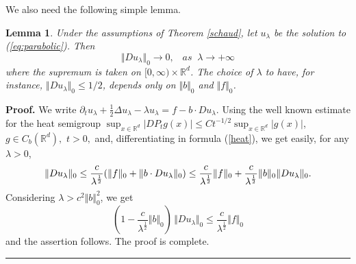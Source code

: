 \documentclass[a4paper,11pt]{article}
\newtheorem{lemma}[theorem]{Lemma}
\newenvironment{proof}[1][Proof]{\textbf{#1.} }{\ \rule{0.5em}{0.5em}}
\begin{document}
We also need the following simple lemma.

\begin{lemma}
\label{grad} Under the assumptions of Theorem \ref{schaud}, let $u_{\lambda }
$ be the solution to (\ref{eq:parabolic}). Then
\begin{equation*}
\Vert Du_{\lambda }\Vert _{0}\rightarrow 0,\;\;\;as\;\;\lambda \rightarrow
+\infty
\end{equation*}
where the supremum is taken on $[0,\infty )\times {\mathbb{R}}^{d}$. The
choice of $\lambda $ to have, for instance, $\Vert Du_{\lambda }\Vert
_{0}\leq 1/2$, depends only on $\Vert b\Vert _{0}$ and $\Vert f\Vert _{0}$.
\end{lemma}

\begin{proof}
We write $\partial _{t}u_{\lambda }+\frac{1}{2}\Delta u_{\lambda }-\lambda
u_{\lambda }=f-b\cdot Du_{\lambda }$. Using the well known estimate for the
heat semigroup $\sup_{x\in \mathbb{R}^{d}}|DP_{t}g(x)|\leq
Ct^{-1/2}\sup_{x\in \mathbb{R}^{d}}|g(x)|$, $g\in C_{b}({\mathbb{R}}^{d}),$ $%
t>0,$ and, differentiating in formula (\ref{heat}), we get easily, for any $%
\lambda >0$,
\begin{equation*}
\Vert Du_{\lambda }\Vert _{0}\leq \frac{c}{\lambda ^{\frac{1}{2}}}(\Vert
f\Vert _{0}+\Vert b\cdot Du_{\lambda }\Vert _{0})\leq \frac{c}{\lambda ^{%
\frac{1}{2}}}\Vert f\Vert _{0}+\frac{c}{\lambda ^{\frac{1}{2}}}\Vert b\Vert
_{0}\Vert Du_{\lambda }\Vert _{0}.
\end{equation*}
Considering $\lambda >c^{2}\Vert b\Vert _{0}^{2}$, we get
\begin{equation*}
(1-\frac{c}{\lambda ^{\frac{1}{2}}}\Vert b\Vert _{0})\,\Vert Du_{\lambda
}\Vert _{0}\leq \frac{c}{\lambda ^{\frac{1}{2}}}\Vert f\Vert _{0}
\end{equation*}
and the assertion follows. The proof is complete.
\end{proof}
\end{document}
